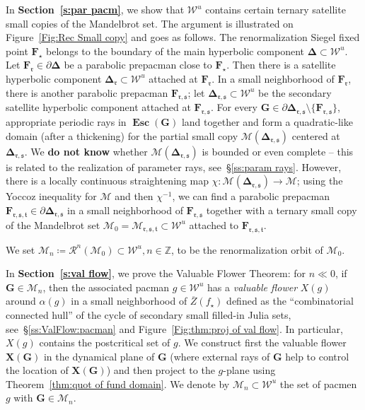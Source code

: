 \documentclass{amsart}
\newcommand{\1}{{\mathbb 1 }}
\newcommand{\Mandel}{{\mathcal{M}}}
\newcommand\MM{\mathscr{M}}
\newcommand\bMM{{\pmb {\MM}}}
\newcommand\HH{\boldsymbol{\Delta}}%
\newcommand\RR{\mathcal{R}}
\newcommand{\bF}{{\mathbf F}}
\newcommand{\bX}{{\mathbf X}}
\newcommand{\bG}{{\mathbf G}}
\newcommand{\str}{{\star}}
\renewcommand{\tt}{\mathfrak{t}}
\newcommand{\rr}{\mathfrak{r}}
\renewcommand{\ss}{\mathfrak{s}}
\newcommand\WW{\mathcal{W}}
\newcommand\Unst{{\boldsymbol{\mathcal{W}}^u}}
\newcommand{\Z}{\mathbb{Z}}
\theoremstyle{remark}
\numberwithin{equation}{section}
\theoremstyle{definition}
\newcommand{\Esc}{{\boldsymbol{\operatorname{Esc}}}}
\theoremstyle{nonumberbreak}
\begin{document}
In {\bf Section~\ref{s:par pacm}}, we show that $\Unst$ contains certain ternary satellite small copies of the Mandelbrot set. The argument is illustrated on Figure~\ref{Fig:Rec Small copy} and goes as follows.  The renormalization Siegel fixed point $\bF_\str$ belongs to the boundary of the main hyperbolic component $\HH\subset \Unst$. Let $\bF_\rr\in \partial \HH$ be a parabolic prepacman close to $\bF_\str$. Then there is a satellite hyperbolic component $\HH_\rr\subset \Unst$ attached at $\bF_\rr$. In a small neighborhood of $\bF_\rr$, there is another parabolic prepacman $\bF_{\rr,\ss}$; let $\HH_{\rr,\ss}\subset \Unst$ be the secondary satellite hyperbolic component attached at $\bF_{\rr,\ss}$. For every $\bG\in \partial \HH_{\rr,\ss}\setminus \{\bF_{\rr,\ss}\}$, appropriate periodic rays in $\Esc(\bG)$ land together and form a quadratic-like domain (after a thickening) for the partial small copy $\bMM(\HH_{\rr,\ss})$ centered at $\HH_{\rr,\ss}$. We {\bf do not know} whether $\bMM(\HH_{\rr,\ss})$ is bounded or even complete -- this is related to the realization of parameter rays, see~\S\ref{ss:param rays}. However, there is a locally continuous straightening map $\chi\colon \bMM(\HH_{\rr,\ss})\to \Mandel$; using the Yoccoz inequality for $\Mandel$ and then $\chi^{-1}$, we can find a parabolic prepacman $\bF_{\rr,\ss,\tt}\in \partial \HH_{\rr,\ss}$ in a small neighborhood of $\bF_{\rr,\ss}$ together with a ternary small copy of the Mandelbrot set $\bMM_0= \bMM_{\rr,\ss,\tt}\subset \Unst$ attached to $\bF_{\rr,\ss,\tt}$. 

We set $\bMM_n\coloneqq \RR^n (\bMM_0)\subset \Unst, n\in \Z$, to be the renormalization orbit of $\bMM_0$. 



In {\bf Section~\ref{s:val flow}}, we prove the Valuable Flower Theorem: for $n\ll 0$, if $\bG\in \bMM_n$, then the associated pacman $g\in \WW^u$ has a \emph{valuable flower} $X(g)$ around $\alpha(g)$ in a small neighborhood of $\overline Z(f_\str)$ defined as the ``combinatorial connected hull'' of the cycle of secondary small filled-in Julia sets, see~\S\ref{ss:ValFlow:pacman} and Figure~\ref{Fig:thm:proj of val flow}. In particular, $X(g)$ contains the postcritical set of $g$. We construct first the valuable flower $\bX(\bG)$ in the dynamical plane of $\bG$  (where external rays of $\bG$ help to control the location of $\bX(\bG)$) and then project to the $g$-plane using Theorem~\ref{thm:quot of fund domain}. We denote by $\MM_n\subset \WW^u$ the set of pacmen $g$ with $\bG\in \bMM_n$.
\end{document}
